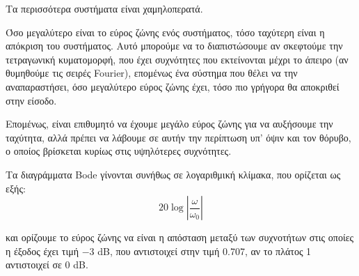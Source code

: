\documentclass[11pt,a4paper,notitlepage,fleqn]{article}
\begin{document}
Τα περισσότερα συστήματα είναι χαμηλοπερατά.

Όσο μεγαλύτερο είναι το εύρος ζώνης ενός συστήματος, τόσο ταχύτερη είναι η απόκριση του
συστήματος. Αυτό μπορούμε να το διαπιστώσουμε αν σκεφτούμε την τετραγωνική κυματομορφή,
που έχει συχνότητες που εκτείνονται μέχρι το άπειρο (αν θυμηθούμε τις σειρές Fourier),
επομένως ένα σύστημα που θέλει να την αναπαραστήσει, όσο μεγαλύτερο εύρος ζώνης έχει,
τόσο πιο γρήγορα θα αποκριθεί στην είσοδο.


Επομένως, είναι επιθυμητό να έχουμε μεγάλο εύρος ζώνης για να αυξήσουμε την ταχύτητα, αλλά
πρέπει να λάβουμε σε αυτήν την περίπτωση υπ' όψιν και τον θόρυβο, ο οποίος βρίσκεται κυρίως
στις υψηλότερες συχνότητες.

Τα διαγράμματα Bode γίνονται συνήθως σε λογαριθμική κλίμακα, που ορίζεται ως εξής:
\[
20\log\left\lvert \frac{\omega}{\omega_0} \right\rvert
\]


και ορίζουμε το εύρος ζώνης να είναι η απόσταση μεταξύ των συχνοτήτων στις οποίες η έξοδος
έχει τιμή \(-3\) dB, που αντιστοιχεί στην τιμή 0.707, αν το πλάτος 1 αντιστοιχεί σε 0 dB.
\end{document}
